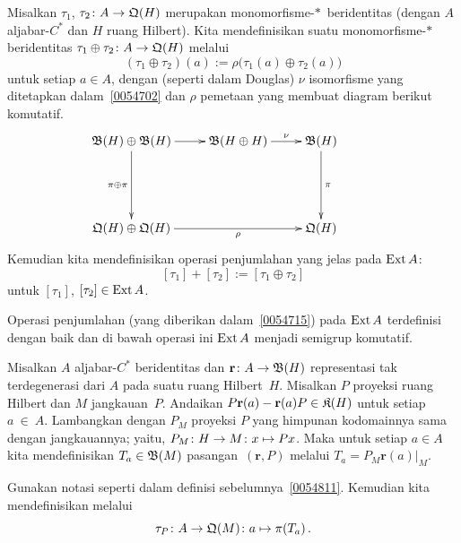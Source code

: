 \begin{defn}\label{0054715} Misalkan $\tau_1$, $\tau_2 \colon A \rightarrow \mathfrak{Q}(H)$ merupakan
monomorfisme-$*\,$ beridentitas (dengan $A$ aljabar-$C^*$ dan $H$ ruang Hilbert). Kita mendefinisikan
suatu monomorfisme-$*\,$ beridentitas $\tau_1 \oplus \tau_2 \colon A \rightarrow \mathfrak{Q}(H)$ melalui
  \[ (\tau_1 \oplus \tau_2)(a) := \rho\bigl(\tau_1(a) \oplus \tau_2(a)\bigr) \]
untuk setiap $a \in A$, dengan (seperti dalam Douglas\cite{Douglas:1980}) $\nu$ isomorfisme yang
ditetapkan dalam~\ref{0054702} dan $\rho$ pemetaan yang membuat diagram berikut
komutatif.
 \begin{equation}\label{0054715i}
  \xymatrix{
    \ofml B(H) \oplus \ofml B(H)\ar[r]\ar[dd]_{\pi \oplus \pi} & \ofml B(H \oplus H)\ar[r]^-\nu
                  & \ofml B(H)\ar[dd]^\pi   \\ & & & \\
    \ofml Q(H) \oplus \ofml Q(H)\ar[rr]_-\rho && \ofml Q(H)
 }\end{equation}
 Kemudian kita mendefinisikan operasi penjumlahan yang jelas pada $\operatorname{Ext} A$:
   \[ [\tau_1] + [\tau_2] := [\tau_1 \oplus \tau_2] \]
untuk $[\tau_1]$, $[\tau_2] \in \operatorname{Ext} A$.
\end{defn}

\begin{prop} Operasi penjumlahan (yang diberikan dalam~\ref{0054715}) pada $\operatorname{Ext} A$ terdefinisi dengan baik
dan di bawah operasi ini $\operatorname{Ext} A$ menjadi semigrup komutatif.
\end{prop}

\begin{defn}\label{0054811} Misalkan $A$ aljabar-$C^*$ beridentitas dan $\mathbf r\colon A \rightarrow
\mathfrak{B}(H)$ representasi tak terdegenerasi dari $A$ pada suatu ruang Hilbert~$H$. Misalkan $P$
proyeksi ruang Hilbert dan $M$ jangkauan~$P$. Andaikan $P\mathbf r(a) -
\mathbf r(a)P \in \mathfrak{K}(H)$ untuk setiap $a~\in~A$. Lambangkan dengan $P_M$ proyeksi $P$
yang himpunan kodomainnya sama dengan jangkauannya; yaitu, $P_M\colon H \rightarrow M \colon x \mapsto
Px$. Maka untuk setiap $a \in A$ kita mendefinisikan
 $T_a \in \mathfrak{B}(M)$
 pasangan~$(\mathbf r,P)$ melalui $T_a = P_M\mathbf
r(a)\bigr|_M$.
\end{defn}

\begin{defn} Gunakan notasi seperti dalam definisi sebelumnya~\ref{0054811}. Kemudian kita mendefinisikan
 melalui
   \[ \tau_P\colon A \rightarrow \mathfrak{Q}(M)\colon a \mapsto \pi(T_a)\,. \]
\end{defn}

